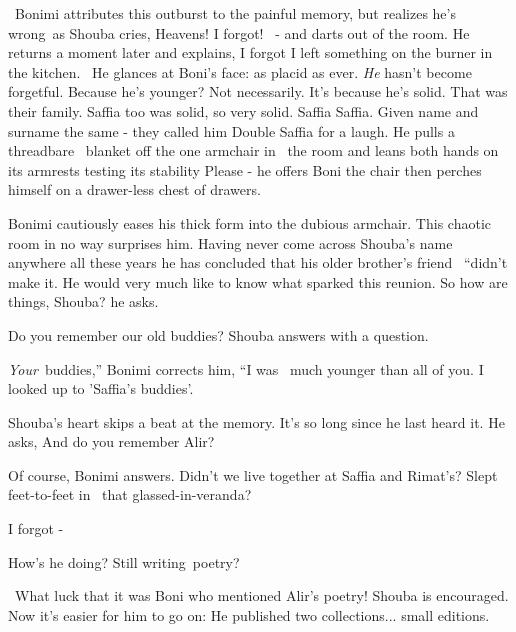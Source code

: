 \documentclass[letterpaper]{article}
\begin{document}
~Bonimi attributes this outburst to the painful memory, but realizes he's wrong~as Shouba cries,
{\textquotedbl}Heavens!\textcolor[rgb]{0.0,0.4392157,0.7529412}{ }I forgot!{\textquotedbl}
\textcolor[rgb]{0.0,0.4392157,0.7529412}{\ }{}- and darts out of the room. He returns a moment later and explains,
{\textquotedbl}I forgot I left something on the burner in the kitchen.{\textquotedbl}~ He glances at Boni's face: as
placid as ever. \textit{He} hasn't become forgetful. Because he's younger? Not necessarily. It's because he's solid.
That was their family. Saffia too was solid, so very solid. Saffia Saffia. Given name and surname the same - they
called him {\textquotedbl}Double Saffia{\textquotedbl} for a laugh. He pulls a threadbare \ blanket off the one
armchair in~ the room and leans both hands on its armrests testing its stability {\textquotedbl}Please -{\textquotedbl}
he offers Boni the chair then perches himself on a drawer-less chest of drawers. 

Bonimi cautiously eases his thick form into the dubious armchair. This chaotic room in no way surprises him. Having
never come across Shouba's name anywhere all these years he has concluded that his older brother's friend \ {}``didn't
make it{\textquotedbl}. He would very much like to know what sparked this reunion. {\textquotedbl}So how are things,
Shouba?{\textquotedbl} he asks.

{\textquotedbl}Do you remember our old buddies?{\textquotedbl} Shouba answers with a question.

{\textquotedbl}\textit{Your}~buddies,'' Bonimi corrects him, ``I was ~much younger than all of you. I looked up to
'Saffia's buddies'.{\textquotedbl} 

Shouba's heart skips a beat at the memory. It's so long since he last heard it. He asks, {\textquotedbl}And do you
remember Alir?{\textquotedbl}

{\textquotedbl}Of course,{\textquotedbl} Bonimi answers. {\textquotedbl}Didn't we live together at Saffia and Rimat's?
Slept feet-to-feet in\textcolor{red}{~} that glassed-in-veranda?{\textquotedbl} 

{\textquotedbl}I forgot -{\textquotedbl} 

{\textquotedbl}How's he doing? Still writing~poetry?{\textquotedbl}

~What luck that it was Boni who mentioned Alir's poetry! Shouba is encouraged. Now it's easier for him to go on:
{\textquotedbl}He published two collections... small\textcolor[rgb]{0.0,0.4392157,0.7529412}{ }editions.{\textquotedbl}
\end{document}
